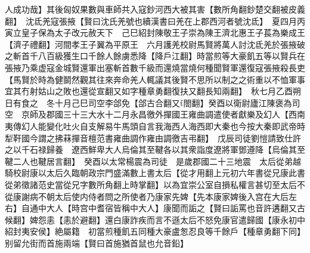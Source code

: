 人成功哉】其後匈奴果數與車師共入寇鈔河西大被其害【數所角翻鈔楚交翻被皮義翻】　沈氐羌寇張掖【賢曰沈氏羌號也續漢書曰羌在上郡西河者號沈氐】　夏四月丙寅立皇子保為太子改元赦天下　己巳紹封陳敬王子崇為陳王濟北惠王子萇為樂成王【濟子禮翻】河間孝王子翼為平原王　六月護羌校尉馬賢將萬人討沈氐羌於張掖破之斬首千八百級獲生口千餘人餘虜悉降【降戶江翻】時當煎等大豪飢五等以賢兵在張掖乃乘虚寇金城賢還軍出塞斬首數千級而還燒當燒何種聞賢軍還復寇張掖殺長吏【馬賢於時為健鬬然觀其往來奔命羌人輒議其後賢不思所以制之之術重以不恤軍事宜其冇射姑山之敗也還從宣翻又如字種章勇翻復扶又翻長知兩翻】　秋七月乙酉朔日有食之　冬十月己巳司空李郃免【郃古合翻又閤翻】癸酉以衛尉廬江陳褒為司空　京師及郡國三十三大水十二月永昌徼外撣國王雍曲調遣使者獻樂及幻人【西南夷傳幻人能變化吐火自支解易牛馬頭自言我海西人海西即大秦也今按大秦即武帝時犁靬國今謂之拂菻撣音檀范書雍曲調作雍由調徼吉弔翻】　戊辰司徒劉愷請致仕許之以千石禄歸養　遼西鮮卑大人烏倫其至鞬各以其衆詣度遼將軍鄧遵降【烏倫其至鞬二人也鞬居言翻】　癸酉以太常楊震為司徒　是歲郡國二十三地震　太后從弟越騎校尉康以太后久臨朝政宗門盛滿數上書太后【從才用翻上元初六年書從兄康此書從弟徵諸范史當從兄字數所角翻上時掌翻】以為宜崇公室自損私權言甚切至太后不從康謝病不朝太后使内侍者問之所使者乃康家先婢【先本康家婢後入宫在大后左右】自通中大人【時宫中耆宿皆稱中大人】康聞而詬之【賢曰詬罵也音許遘翻又古候翻】婢怨恚【恚於避翻】還白康詐疾而言不遜太后不怒免康官遣歸國【康永初中紹封夷安侯】絶屬籍　初當煎種飢五同種大豪盧怱忍良等千餘戶【種章勇翻下同】别留允街而首施兩端【賢曰首施猶首鼠也允音鉛】


